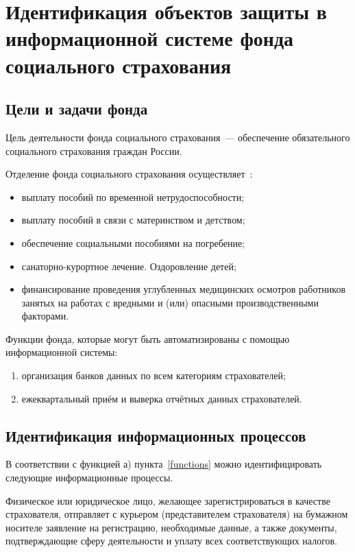 \section{Идентификация объектов защиты в
  информационной системе фонда
  социального страхования}

\subsection{Цели и задачи фонда}

\point Цель деятельности фонда социального страхования~--- обеспечение
обязательного социального страхования граждан России.

\point Отделение фонда социального страхования осуществляет~\cite{2}:

\begin{itemize}
\item выплату пособий по временной нетрудоспособности;
\item выплату пособий в связи с материнством и детством;
\item обеспечение социальными пособиями на погребение;
\item санаторно-курортное лечение. Оздоровление детей;
\item финансирование проведения углубленных медицинских осмотров
  работников занятых на работах с вредными и (или) опасными
  производственными факторами.
\end{itemize}

\point Функции фонда, которые могут быть автоматизированы с помощью
информационной системы: \label{functions}

\begin{enumerate}
\item организация банков данных по всем категориям страхователей;
\item ежеквартальный приём и выверка отчётных данных страхователей.
\end{enumerate}

\subsection{Идентификация информационных процессов}

В соответствии с функцией а) пункта~\ref{functions} можно
идентифицировать следующие информационные процессы.

\point Физическое или юридическое лицо, желающее зарегистрироваться в
качестве страхователя, отправляет с курьером (представителем
страхователя) на бумажном носителе заявление на регистрацию,
необходимые данные, а также документы, подтверждающие сферу
деятельности и уплату всех соответствующих налогов.


